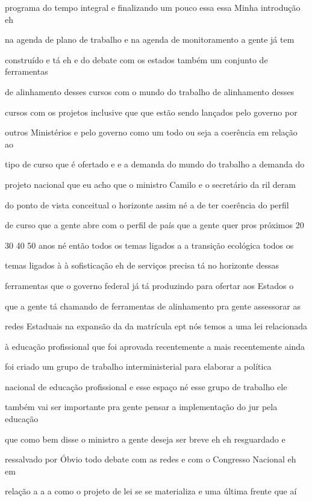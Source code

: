 \documentclass[a4paper,12pt]{article}
\begin{document}
programa do tempo integral e finalizando um pouco essa essa Minha introdução eh

na agenda de plano de trabalho e na agenda de monitoramento a gente já tem

construído e tá eh e do debate com os estados também um conjunto de ferramentas

de alinhamento desses cursos com o mundo do trabalho de alinhamento desses

cursos com os projetos inclusive que que estão sendo lançados pelo governo por

outros Ministérios e pelo governo como um todo ou seja a coerência em relação ao

tipo de curso que é ofertado e e a demanda do mundo do trabalho a demanda do

projeto nacional que eu acho que o ministro Camilo e o secretário da ril deram

do ponto de vista conceitual o horizonte assim né a de ter coerência do perfil

de curso que a gente abre com o perfil de país que a gente quer pros próximos 20

30 40 50 anos né então todos os temas ligados a a transição ecológica todos os

temas ligados à à sofisticação eh de serviços precisa tá no horizonte dessas

ferramentas que o governo federal já tá produzindo para ofertar aos Estados o

que a gente tá chamando de ferramentas de alinhamento pra gente assessorar as

redes Estaduais na expansão da da matrícula ept nós temos a uma lei relacionada

à educação profissional que foi aprovada recentemente a mais recentemente ainda

foi criado um grupo de trabalho interministerial para elaborar a política

nacional de educação profissional e esse espaço né esse grupo de trabalho ele

também vai ser importante pra gente pensar a implementação do jur pela educação

que como bem disse o ministro a gente deseja ser breve eh eh resguardado e

ressalvado por Óbvio todo debate com as redes e com o Congresso Nacional eh em

relação a a a como o projeto de lei se se materializa e uma última frente que aí
\end{document}
